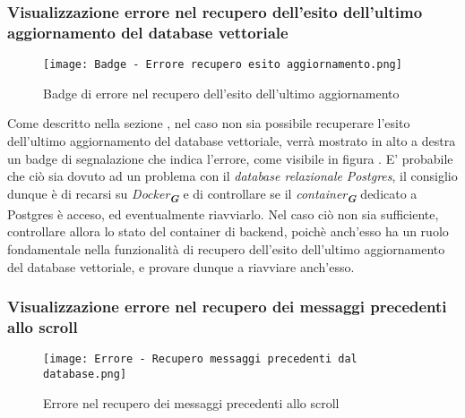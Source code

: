 \subsubsection{Visualizzazione errore nel recupero dell'esito dell'ultimo aggiornamento del database vettoriale}

\begin{figure}[h]
    \centering
        \texttt{[image: Badge - Errore recupero esito aggiornamento.png]}
        \caption{Badge di errore nel recupero dell'esito dell'ultimo aggiornamento}
        \label{fig:Badge di errore nel recupero dell'esito dell'ultimo aggiornamento}
\end{figure}

Come descritto nella sezione , nel caso non sia possibile recuperare l'esito dell'ultimo aggiornamento del database vettoriale, verrà mostrato in alto a destra un badge di segnalazione che indica l'errore, come visibile in figura . E' probabile che ciò sia dovuto ad un problema con il \emph{database relazionale} \emph{Postgres}, il consiglio dunque è di recarsi su \emph{Docker}\textsubscript{\textbf{\textit{G}}} e di controllare se il \emph{container}\textsubscript{\textbf{\textit{G}}} dedicato a Postgres è acceso, ed eventualmente riavviarlo. Nel caso ciò non sia sufficiente, controllare allora lo stato del container di backend, poichè anch'esso ha un ruolo fondamentale nella funzionalità di recupero dell'esito dell'ultimo aggiornamento del database vettoriale, e provare dunque a riavviare anch'esso.


\subsubsection{Visualizzazione errore nel recupero dei messaggi precedenti allo scroll}

\begin{figure}[h]
    \centering
        \texttt{[image: Errore - Recupero messaggi precedenti dal database.png]}
        \caption{Errore nel recupero dei messaggi precedenti allo scroll}
        \label{fig:Errore nel recupero dei messaggi precedenti allo scroll}
\end{figure}

